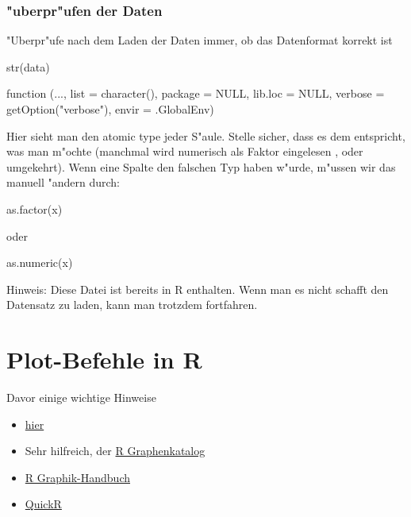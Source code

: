 \documentclass[a4paper,twoside]{tufte-book}\usepackage[]{graphicx}\usepackage[]{color}
\begin{document}
\begin{appendices}
\subsection{"uberpr"ufen der Daten}

"Uberpr"ufe nach dem Laden der Daten immer, ob das Datenformat korrekt ist

\begin{Schunk}
\begin{Sinput}
str(data)
\end{Sinput}
\begin{Soutput}
function (..., list = character(), package = NULL, lib.loc = NULL, 
    verbose = getOption("verbose"), envir = .GlobalEnv)  
\end{Soutput}
\end{Schunk}

Hier sieht man den atomic type jeder S"aule. Stelle sicher, dass es dem entspricht, was man m"ochte (manchmal wird numerisch als Faktor eingelesen , oder umgekehrt). Wenn eine Spalte den falschen Typ haben w"urde, m"ussen wir das manuell "andern durch:

\begin{Schunk}
\begin{Sinput}
as.factor(x)
\end{Sinput}
\end{Schunk}
oder 
\begin{Schunk}
\begin{Sinput}
as.numeric(x)
\end{Sinput}
\end{Schunk}


Hinweis: Diese Datei ist bereits in R enthalten. Wenn man es nicht schafft den Datensatz zu laden, kann man trotzdem fortfahren.

\chapter{Plot-Befehle in R}

Davor einige wichtige Hinweise

\begin{itemize}
\item \href{http://rgraphgallery.blogspot.de/search/label/3%20vartiable%20plots}{hier}
\item Sehr hilfreich, der \href{http://shiny.stat.ubc.ca/r-graph-catalog/#}{R Graphenkatalog}
\item \href{http://rgm3.lab.nig.ac.jp/RGM/R_image_list?page=2282&init=true}{R Graphik-Handbuch}
\item \href{http://www.statmethods.net/graphs/line.html}{QuickR}
\end{itemize}



\end{appendices}
\end{document}
